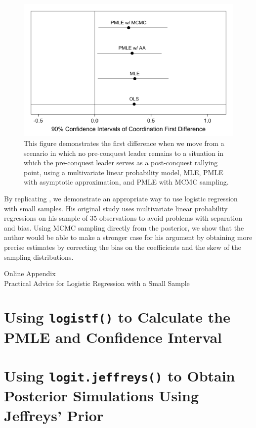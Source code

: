 \documentclass[12pt]{article}
\begin{document}
\begin{figure}[H]
\begin{center}
\includegraphics[width = \textwidth]{weisiger-coordfd.png}
\caption{This figure demonstrates the first difference when we move from a scenario in which no pre-conquest leader remains to a situation in which the pre-conquest leader serves as a post-conquest rallying point, using a multivariate linear probability model, MLE, PMLE with asymptotic approximation, and PMLE with MCMC sampling.}\label{fig:coord-fd}
\end{center}
\end{figure}

By replicating \citet{Weisiger2014}, we demonstrate an appropriate way to use logistic regression with small samples. His original study uses multivariate linear probability regressions on his sample of 35 observations to avoid problems with separation and bias. Using MCMC sampling directly from the posterior, we show that the author would be able to make a stronger case for his argument by obtaining more precise estimates by correcting the bias on the coefficients and the skew of the sampling distributions. 

\singlespace 
\newpage
\normalsize

% 


\newpage
\begin{appendix}
\begin{center}
{\LARGE Online Appendix}\\
{\large Practical Advice for Logistic Regression with a Small Sample}\\\vspace{2mm}
\end{center}


\section{Using \texttt{logistf()} to Calculate the PMLE and Confidence Interval}

\section{Using \texttt{logit.jeffreys()} to Obtain Posterior Simulations Using Jeffreys' Prior}

\end{appendix}
\end{document}
